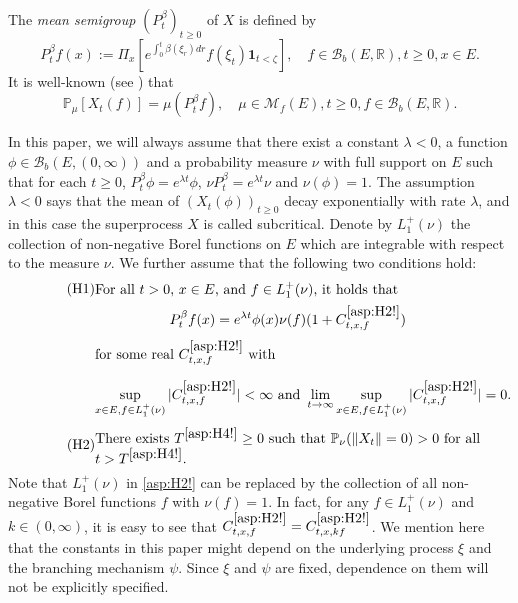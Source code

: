 \documentclass[12pt,a4paper]{amsart}
\numberwithin{equation}{section}
\theoremstyle{plain}
\theoremstyle{definition}
\theoremstyle{remark}
\begin{document}
	The \emph{mean semigroup} $(P_t^\beta)_{t\geq 0}$ of $X$ is defined by
\begin{equation}
	P_t^\beta f(x)
	:= \Pi_x\left[e^{\int_0^t \beta(\xi_r)dr }f(\xi_t)  \mathbf 1_{t < \zeta}\right],
	\quad f\in \mathcal B_b(E,\mathbb R), t\geq 0, x\in E.
\end{equation}
	It is well-known (see \cite[Proposition 2.27]{Li2011MeasureValued}) that
\begin{equation} \label{Fact:M!}
	\mathbb P_\mu[X_t(f)] = \mu (P_t^\beta f),
	\quad \mu \in \mathcal M_f(E), t\geq 0, f \in \mathcal B_b(E,\mathbb R).
\end{equation}	

	In this paper, we will always assume that there exist a constant $\lambda<0$, a function $\phi \in \mathcal B_b(E,(0,\infty))$ and a probability measure $\nu$ with full support on $E$ such that for each $t\geq 0$, $P_t^\beta \phi = e^{\lambda t}\phi$, $\nu P_t^\beta = e^{\lambda t} \nu$ and $\nu(\phi) = 1$.
	The assumption $\lambda<0$ says that the mean of $(X_t(\phi))_{t\geq 0}$ decay exponentially with rate $\lambda$, and in this case the superprocess $X$ is called subcritical.
	Denote by $L_1^+(\nu)$ the collection of non-negative Borel functions on $E$ which are integrable with respect to the measure $\nu$.
	We further assume that the following two conditions  hold:
\begin{align}
\label{asp:H2!} \tag{H1}
&\begin{minipage}{0.8\textwidth}
	For all $t>0$, $x\in E$, and $f\in L_1^+(\nu)$, it holds that
\end{minipage}
\\
&\begin{minipage}{0.8\textwidth}
	\[ P_t^\beta f(x) = e^{\lambda t} \phi(x) \nu(f) (1+ C^{\eqref{asp:H2!}}_{t,x,f})\]
	for some real $C^{\eqref{asp:H2!}}_{t,x,f}$ with
	\[\sup_{x\in E, f\in L_1^+(\nu)} |C^{\eqref{asp:H2!}}_{t,x,f}| < \infty
	\mbox{ and }
	\lim_{t\to \infty} \sup_{x\in E, f\in L_1^+(\nu)} |C^{\eqref{asp:H2!}}_{t,x,f}| = 0.\]
\end{minipage}
\end{align}
\begin{equation}
\label{asp:H4!} \tag{H2}
\begin{minipage}{0.8\textwidth}
	There exists  $T^{\eqref{asp:H4!}}\geq 0$ such that $\mathbb P_\nu(\|X_t\| = 0)>0$ for all $t> T^{\eqref{asp:H4!}}$.
\end{minipage}
\end{equation}
	Note that $L_1^+(\nu)$ in \eqref{asp:H2!} can be replaced by the collection of all non-negative Borel functions $f$ with $\nu(f) = 1$.
	In fact, for any $f\in L_1^+(\nu)$ and $k \in (0,\infty)$, it is easy to see that $C^{\eqref{asp:H2!}}_{t,x,f} = C^{\eqref{asp:H2!}}_{t,x,kf}$.
	We  mention here that the constants in this paper might depend on the underlying process $\xi$ and the branching mechanism $\psi$.
	Since $\xi$ and $\psi$ are fixed, dependence on them will not be explicitly specified.
\end{document}
